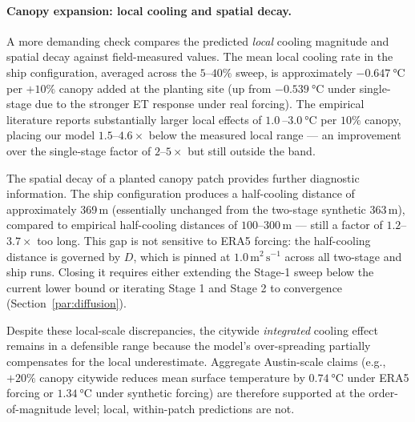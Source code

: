 \documentclass[12pt, letterpaper]{article}
\begin{document}
\paragraph{Canopy expansion: local cooling and spatial decay.}
A more demanding check compares the predicted \emph{local} cooling magnitude
and spatial decay against field-measured values. The mean local cooling rate
in the ship configuration, averaged across the $5$--$40\%$ sweep, is
approximately $\SI{-0.647}{\degreeCelsius}$ per $+10\%$ canopy added at
the planting site (up from $\SI{-0.539}{\degreeCelsius}$ under single-stage
due to the stronger ET response under real forcing).
The empirical literature reports substantially larger local effects of
$\SI{1.0}{}$--$\SI{3.0}{\degreeCelsius}$ per $10\%$ canopy, placing our
model $1.5$--$4.6\times$ below the measured local range — an improvement
over the single-stage factor of $2$--$5\times$ but still outside the band.

The spatial decay of a planted canopy patch provides further diagnostic
information. The ship configuration produces a half-cooling distance of
approximately 369\,m (essentially unchanged from the two-stage synthetic
363\,m), compared to empirical half-cooling distances of
$100$--$300\,\text{m}$ — still a factor of $1.2$--$3.7\times$ too long.
This gap is not sensitive to ERA5 forcing: the half-cooling distance is
governed by $D$, which is pinned at $1.0\,\text{m}^2\,\text{s}^{-1}$
across all two-stage and ship runs. Closing it requires either extending
the Stage-1 sweep below the current lower bound or iterating Stage 1 and
Stage 2 to convergence (Section~\ref{par:diffusion}).

Despite these local-scale discrepancies, the citywide \emph{integrated}
cooling effect remains in a defensible range because the model's
over-spreading partially compensates for the local underestimate.
Aggregate Austin-scale claims (e.g., $+20\%$ canopy citywide reduces
mean surface temperature by $\SI{0.74}{\degreeCelsius}$ under ERA5
forcing or $\SI{1.34}{\degreeCelsius}$ under synthetic forcing) are
therefore supported at the order-of-magnitude level; local, within-patch
predictions are not.
\end{document}
